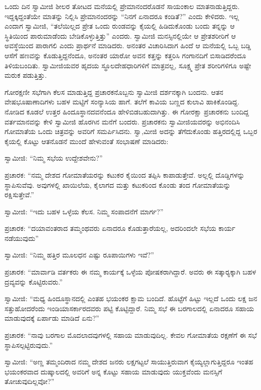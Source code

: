  ಒಂದು ದಿನ ಸ್ವಾಮೀಜಿ ಶೀಲರ ತೋಟದ ಮನೆಯಲ್ಲಿ ಪ್ರೇಮಾನಂದರೊಡನೆ ಸಾಯಂಕಾಲ ಮಾತನಾಡುತ್ತಿದ್ದರು. ಇದ್ದಕ್ಕಿದ್ದಂತೆಯೇ ಮಾತನ್ನು ನಿಲ್ಲಿಸಿ ಪ್ರೇಮಾನಂದರನ್ನು “ನಿನಗೆ ಏನಾದರೂ ಕಂಡಿತೆ?” ಎಂದು ಕೇಳಿದರು. ಇಲ್ಲ ಎಂದಾಗ ಸ್ವಾಮೀಜಿ, “ತಲೆಯಿಲ್ಲದ ಪ್ರೇತ ಒಂದು ರುಂಡವನ್ನು ಕೈಯಲ್ಲಿ ಹಿಡಿದುಕೊಂಡು ಬಂದು ತನ್ನನ್ನು ಆ ಸ್ಥಿತಿಯಿಂದ ಪಾರುಮಾಡೆಂದು ಬೇಡಿಕೊಳ್ಳುತ್ತಿತ್ತು” ಎಂದರು. ಸ್ವಾಮೀಜಿ ಮನಸ್ಸಿನಲ್ಲಿಯೇ ಆ ಪ್ರೇತಶರೀರಿಗೆ ಆ ಅವಸ್ಥೆಯಿಂದ ಪಾರಾಗಲಿ ಎಂದು ಪ್ರಾರ್ಥನೆ ಮಾಡಿದರು. ಅನಂತರ ವಿಚಾರಿಸಿದಾಗ ಹಿಂದೆ ಆ ಮನೆಯಲ್ಲಿ ಒಬ್ಬ ಬಡ್ಡಿ ಆಸೆಗೆ ಹಣವನ್ನು ಕೊಡುತ್ತಿದ್ದನೆಂದೂ, ಅನಂತರ ಯಾರೋ ಅವನ ಕತ್ತನ್ನು ಕತ್ತರಿಸಿ ಗಂಗಾನದಿಗೆ ಬಿಸಾಡಿದರೆಂದೂ ತಿಳಿಯಬಂದಿತು. ಸ್ವಾಮೀಜಿಯವರ ಹೃದಯ ಸ್ಥೂಲದೇಹಧಾರಿಗಳಿಗೆ ಮಾತ್ರವಲ್ಲ, ಸೂಕ್ಷ್ಮ ಪ್ರೇತ ಶರೀರಿಗಳಿಗೂ ಅಷ್ಟೇ ಮರುಕ ಪಡುತ್ತಿತ್ತು. 

 ಗೋರಕ್ಷಣೀ ಸಭೆಗಾಗಿ ಕೆಲಸ ಮಾಡುತ್ತಿದ್ದ ಪ್ರಚಾರಕನೊಬ್ಬನು ಸ್ವಾಮೀಜಿ ದರ್ಶನಕ್ಕಾಗಿ ಬಂದನು. ಆತನ ವೇಷಭೂಷಾಣಾದಿಗಳು ಬಹಳ ಮಟ್ಟಿಗೆ ಸಂನ್ಯಾಸಿಯ ಹಾಗೆ. ತಲೆಗೆ ಕಾವಿಯ ಬಣ್ಣದ ಕುಲಾವಿ ಹಾಕಿಕೊಂಡಿದ್ದ. ನೋಡಿದ ಕೂಡಲೆ ಉತ್ತರ ಹಿಂದೂಸ್ಥಾನದವನೆಂದೂ ಹೇಳಿಬಿಡಬಹುದಾಗಿತ್ತು. ಈ ಗೋರಕ್ಷಾ ಪ್ರಚಾರಕನು ಬಂದಿದ್ದ ವರ್ತಮಾನವನ್ನು ಕೇಳಿ ಸ್ವಾಮೀಜಿ ಹೊರಗಿನ ಮನೆಗೆ ಬಂದರು. ಪ್ರಚಾರಕನು ಸ್ವಾಮೀಜಿಯವರನ್ನು ಅಭಿನಂದಿಸಿ ಗೋಮಾತೆಯ ಒಂದು ಚಿತ್ರವನ್ನು ಅವರಿಗೆ ಸಮರ್ಪಿಸಿದನು. ಸ್ವಾ,ಮೀಜಿ ಅದನ್ನು ತೆಗೆದುಕೊಂಡು ಹತ್ತಿರದಲ್ಲಿದ್ದ ಒಬ್ಬರ ಕೈಯಲ್ಲಿ ಕೊಟ್ಟು ಆತನೊಡನೆ ಮುಂದೆ ಹೇಳುವಂತೆ ಸಂಭಾಷಣೆ ಮಾಡಿದರು: 

 ಸ್ವಾಮೀಜಿ: “ನಿಮ್ಮ ಸಭೆಯ ಉದ್ದೇಶವೇನು?” 

 ಪ್ರಚಾರಕ: “ನಮ್ಮ ದೇಶದ ಗೋಮಾತೆಯರನ್ನು ಕಟುಕರ ಕೈಯಿಂದ ತಪ್ಪಿಸಿ ಕಾಪಾಡುತ್ತೇವೆ. ಅಲ್ಲಲ್ಲಿ ದೊಡ್ಡಿಗಳನ್ನು ಸ್ಥಾಪಿಸುವೆವು. ಅವುಗಳಲ್ಲಿ ಖಾಯಿಲೆಯ, ಕೈಲಾಗದ ಮತ್ತು ಕಟುಕರಿಂದ ಕೊಂಡು ತಂದ ಗೋಮಾತೆಯನ್ನು ರಕ್ಷಿಸುತ್ತೇವೆ.” 

 ಸ್ವಾಮೀಜಿ: “ಇದು ಬಹಳ ಒಳ್ಳೆಯ ಕೆಲಸ. ನಿಮ್ಮ ಸಂಪಾದನೆಗೆ ಮಾರ್ಗ?” 

 ಪ್ರಚಾರಕ: “ದಯಾವಂತರಾದ ತಮ್ಮಂಥವರು ಏನಾದರೂ ಕೊಡುತ್ತಾರೆಯಲ್ಲ, ಅದರಿಂದಲೇ ಸಭೆಯ ಕಾರ್ಯ ನಡೆಯುವುದು” 

 ಸ್ವಾಮೀಜಿ: “ನಿಮ್ಮ ಹತ್ತಿರ ಮೂಲಧನ ಎಷ್ಟು ರೂಪಾಯಿಗಳು ಇವೆ?” 

 ಪ್ರಚಾರಕ: “ಮಾರ್ವಾಡಿ ವರ್ತಕರು ಈ ನಮ್ಮ ಕಾರ್ಯಕ್ಕೆ ಒಳ್ಳೆಯ ಪೋಷಕರಾಗಿದ್ದಾರೆ. ಅವರು ಈ ಸತ್ಕಾರ‍್ಯಕ್ಕಾಗಿ ಬಹಳ ದ್ರವ್ಯವನ್ನು ಕೊಟ್ಟಿರುವರು.” 

 ಸ್ವಾಮೀಜಿ: “ಮಧ್ಯ ಹಿಂದೂಸ್ಥಾನದಲ್ಲಿ ಎಂತಹ ಭಯಂಕರ ಕ್ಷಾಮ ಬಂದಿದೆ. ಹೊಟ್ಟೆಗೆ ಹಿಟ್ಟು ಇಲ್ಲದೆ ಒಂದು ಲಕ್ಷ ಜನ ಸತ್ತುಹೋದರೆಂದು ಇಂಡಿಯಾ\break ಸರ್ಕಾರದವರು ಪಟ್ಟಿ ಕೊಟ್ಟಿದ್ದಾರೆ. ನಿಮ್ಮ ಸಭೆ ಈ ಬರಗಾಲದಲ್ಲಿ ಏನಾದರೂ ಸಹಾಯ ಮಾಡುವುದಕ್ಕೆ ಏರ್ಪಾಡು ಮಾಡಿದೆ ಏನು?” 

 ಪ್ರಚಾರಕ: “ನಾವು ಬರಗಾಲ ಮೊದಲಾದವುಗಳಲ್ಲಿ ಸಹಾಯ ಮಾಡುವುದಿಲ್ಲ. ಕೇವಲ ಗೋಮಾತೆಯ ರಕ್ಷಣೆಗೆ ಈ ಸಭೆ ಸ್ಥಾಪಿಸಲ್ಪಟ್ಟಿರುವುದು.” 

 ಸ್ವಾಮೀಜಿ: “ಅಣ್ಣ ತಮ್ಮಂದಿರಾದ ನಮ್ಮ ದೇಶದ ಜನರು ಲಕ್ಷಗಟ್ಟಲೆ ಸಾಯುತ್ತಿರುವಾಗ ಕೈಯ್ಯಲ್ಲಾಗುತ್ತಿದ್ದರೂ ಇಂತಹ ಭಯಂಕರವಾದ ದುಷ್ಕಾಲದಲ್ಲಿ ಅವರಿಗೆ ಅನ್ನ ಕೊಟ್ಟು ಸಹಾಯ ಮಾಡುವುದು ಯುಕ್ತವೆಂದು ಮನಸ್ಸಿಗೆ ತೋಚುವುದಿಲ್ಲವೋ?” 


